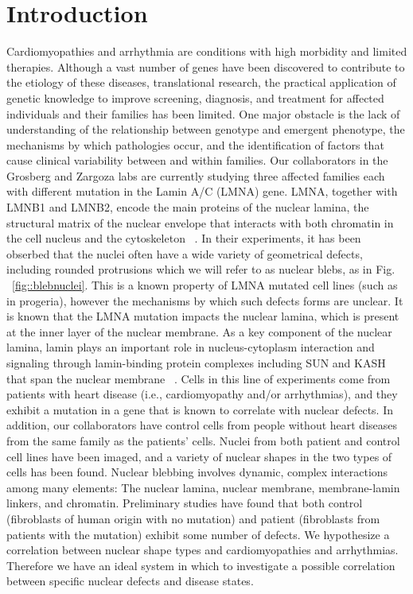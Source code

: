 \section{Introduction}
Cardiomyopathies and arrhythmia are conditions with high morbidity and limited therapies. Although a vast number of genes have been discovered to contribute to the etiology of these diseases, translational research, the practical application of genetic knowledge to improve screening, diagnosis, and treatment for affected individuals and their families has been limited. One major obstacle is the lack of understanding of the relationship between genotype and emergent phenotype, the mechanisms by which pathologies occur, and the identification of factors that cause clinical variability between and within families. Our collaborators in the Grosberg and Zargoza labs are currently studying three affected families each with different mutation in the Lamin A/C (LMNA) gene.  LMNA, together with LMNB1 and LMNB2, encode the main proteins of the nuclear lamina, the structural matrix of the nuclear envelope that interacts with both chromatin in the cell nucleus and the cytoskeleton ~\cite{Capell2006}. In their experiments, it has been obserbed that the nuclei often have a wide variety of geometrical defects, including rounded protrusions which we will refer to as nuclear blebs, as in Fig. ~\ref{fig::blebnuclei}. This is a known property of LMNA mutated cell lines (such as in progeria), however the mechanisms by which such defects forms are unclear. It is known that the LMNA mutation impacts the nuclear lamina, which is present at the inner layer of the nuclear membrane. As a key component of the nuclear lamina, lamin plays an important role in nucleus-cytoplasm interaction and signaling through lamin-binding protein complexes including SUN and KASH that span the nuclear membrane ~\cite{Ho2012}. Cells in this line of experiments come from patients with heart disease (i.e., cardiomyopathy and/or arrhythmias), and they exhibit a mutation in a gene that is known to correlate with nuclear defects. In addition, our collaborators have control cells from people without heart diseases from the same family as the patients' cells.  Nuclei from both patient and control cell lines have been imaged, and  a variety of nuclear shapes in the two types of cells has been found. Nuclear blebbing involves dynamic, complex interactions among many elements: The nuclear lamina, nuclear membrane, membrane-lamin linkers, and chromatin. Preliminary studies have found that both control (fibroblasts of human origin with no mutation) and patient (fibroblasts from patients with the mutation) exhibit some number of defects. We hypothesize a correlation between nuclear shape types and cardiomyopathies and arrhythmias. Therefore we have an ideal system in which to investigate a possible correlation between specific nuclear defects and disease states.

